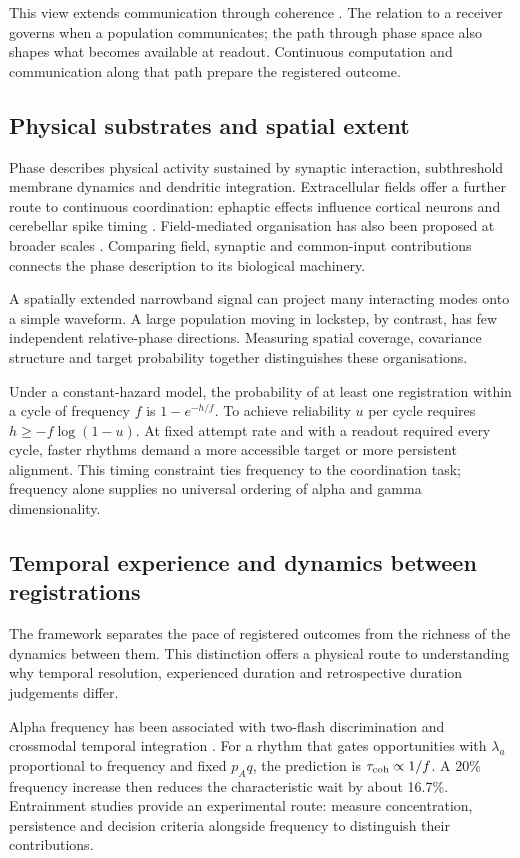 \documentclass[11pt]{article}
\begin{document}
This view extends communication through coherence \cite{fries2005,fries2015}.
The relation to a receiver governs when a population communicates; the
path through phase space also shapes what becomes available at readout.
Continuous computation and communication along that path prepare the
registered outcome.

\subsection{Physical substrates and spatial extent}

Phase describes physical activity sustained by synaptic interaction,
subthreshold membrane dynamics and dendritic integration. Extracellular
fields offer a further route to continuous coordination: ephaptic effects
influence cortical neurons and cerebellar spike timing
\cite{anastassiou2011,han2018}. Field-mediated organisation has also been
proposed at broader scales \cite{pinotsis2023}. Comparing field,
synaptic and common-input contributions connects the phase description
to its biological machinery.

A spatially extended narrowband signal can project many interacting modes
onto a simple waveform. A large population moving in lockstep, by
contrast, has few independent relative-phase directions. Measuring spatial
coverage, covariance structure and target probability together distinguishes
these organisations.

Under a constant-hazard model, the probability of at least one
registration within a cycle of frequency $f$ is $1-e^{-h/f}$.
To achieve reliability $u$ per cycle requires $h\geq-f\log(1-u)$.
At fixed attempt rate and with a readout required every cycle, faster
rhythms demand a more accessible target or more persistent alignment.
This timing constraint ties frequency to the coordination task; frequency
alone supplies no universal ordering of alpha and gamma dimensionality.

\subsection{Temporal experience and dynamics between registrations}

The framework separates the pace of registered outcomes from the richness
of the dynamics between them. This distinction offers a physical route
to understanding why temporal resolution, experienced duration and
retrospective duration judgements differ.

Alpha frequency has been associated with two-flash discrimination and
crossmodal temporal integration \cite{samaha2015,cecere2015}.
For a rhythm that gates opportunities with $\lambda_a$ proportional to
frequency and fixed $p_Aq$, the prediction is $\tau_{\rm coh}\propto1/f$.
A 20\% frequency increase then reduces the characteristic wait by about
16.7\%. Entrainment studies \cite{helfrich2014} provide an experimental
route: measure concentration, persistence and decision criteria alongside
frequency to distinguish their contributions.
\end{document}
